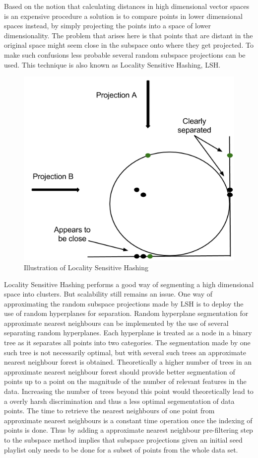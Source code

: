 \documentclass[a4paper,11pt]{kth-mag}
\begin{document}
Based on the notion that calculating distances in high dimensional vector spaces is an expensive procedure a solution is to compare points in lower dimensional spaces instead, by simply projecting the points into a space of lower dimensionality. The problem that arises here is that points that are distant in the original space might seem close in the subspace onto where they get projected. To make such confusions less probable several random subspace projections can be used. This technique is also known as Locality Sensitive Hashing, LSH.

\begin{figure}
\includegraphics[scale=0.5]{images/LSH.png}
\caption{Illustration of Locality Sensitive Hashing}
\end{figure}

Locality Sensitive Hashing performs a good way of segmenting a high dimensional space into clusters. But scalability still remains an issue. One way of approximating the random subspace projections made by LSH is to deploy the use of random hyperplanes for separation. Random hyperplane segmentation for approximate nearest neighbours can be implemented by the use of several separating random hyperplanes. Each hyperplane is treated as a node in a binary tree as it separates all points into two categories. The segmentation made by one such tree is not necessarily optimal, but with several such trees an approximate nearest neighbour forest is obtained. Theoretically a higher number of trees in an approximate nearest neighbour forest should provide better segmentation of points up to a point on the magnitude of the number of relevant features in the data. Increasing the number of trees beyond this point would theoretically lead to a overly harsh discrimination and thus a less optimal segementation of data points. The time to retrieve the nearest neighbours of one point from approximate nearest neighbours is a constant time operation once the indexing of points is done. Thus by adding a approximate nearest neighbour pre-filtering step to the subspace method implies that subspace projections given an initial seed playlist only needs to be done for a subset of points from the whole data set.
\end{document}
